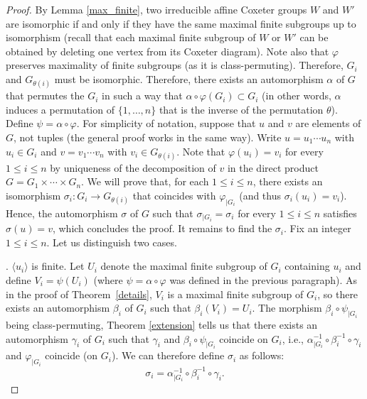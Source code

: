 \documentclass[a4paper, 11pt]{amsart}
\theoremstyle{definition}
\theoremstyle{remark}
\renewcommand{\leq}{\leqslant}
\begin{document}
\begin{proof}
\smallskip \noindent By Lemma \ref{max_finite}, two irreducible affine Coxeter groups $W$ and $W'$ are isomorphic if and only if they have the same maximal finite subgroups up to isomorphism (recall that each maximal finite subgroup of $W$ or $W'$ can be obtained by deleting one vertex from its Coxeter diagram). Note also that $\varphi$ preserves maximality of finite subgroups (as it is class-permuting). Therefore, $G_i$ and $G_{\theta(i)}$ must be isomorphic. Therefore, there exists an automorphism $\alpha$ of $G$ that permutes the $G_i$ in such a way that $\alpha\circ \varphi(G_i)\subset G_i$ (in other words, $\alpha$ induces a permutation of $\lbrace 1,\ldots,n\rbrace$ that is the inverse of the permutation $\theta$). Define $\psi=\alpha\circ \varphi$. For simplicity of notation, suppose that $u$ and $v$ are elements of $G$, not tuples (the general proof works in the same way). Write $u=u_1\cdots u_n$ with $u_i\in G_i$ and $v=v_1\cdots v_n$ with $v_i\in G_{\theta(i)}$. Note that $\varphi(u_i)=v_i$ for every $1\leq i\leq n$ by uniqueness of the decomposition of $v$ in the direct product $G=G_1\times \cdots\times G_n$. We will prove that, for each $1\leq i\leq n$, there exists an isomorphism $\sigma_i:G_i\rightarrow G_{\theta(i)}$ that coincides with $\varphi_{\vert G_i}$ (and thus $\sigma_i(u_i)=v_i$). Hence, the automorphism $\sigma$ of $G$ such that $\sigma_{\vert G_i}=\sigma_i$ for every $1\leq i\leq n$ satisfies $\sigma(u)=v$, which concludes the proof. It remains to find the $\sigma_i$. Fix an integer $1\leq i\leq n$. Let us distinguish two cases.

\smallskip {}. $\langle u_i\rangle$ is finite.
\newline Let $U_i$ denote the maximal finite subgroup of $G_i$ containing $u_i$ and define $V_i=\psi(U_i)$ (where $\psi=\alpha\circ \varphi$ was defined in the previous paragraph). As in the proof of Theorem~\ref{details}, $V_i$ is a maximal finite subgroup of $G_i$, so there exists an automorphism $\beta_i$ of $G_i$ such that $\beta_i(V_i)=U_i$. The morphism $\beta_i\circ \psi_{\vert G_i}$ being class-permuting, Theorem \ref{extension} tells us that there exists an automorphism $\gamma_i$ of $G_i$ such that $\gamma_i$ and $\beta_i\circ \psi_{\vert G_i}$ coincide on $G_i$, i.e., $\alpha^{-1}_{\vert G_i}\circ \beta_i^{-1}\circ \gamma_i$ and $\varphi_{\vert G_i}$ coincide (on $G_i$). We can therefore define $\sigma_i$ as follows: \[\sigma_i=\alpha^{-1}_{\vert G_i}\circ \beta_i^{-1}\circ \gamma_i.\]



\end{proof}
\end{document}
